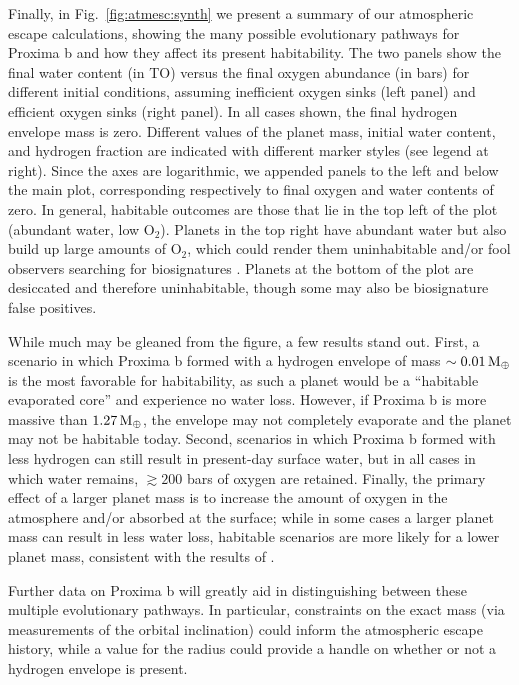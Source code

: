 \documentclass[preprint,12pt]{aastex}
\def\mearth{{\rm\,M_\oplus}}
\begin{document}
Finally, in Fig.~\ref{fig:atmesc:synth} we present a summary of our
atmospheric escape calculations, showing the many possible
evolutionary pathways for Proxima b and how they affect its present
habitability. The two panels show the final water content (in TO)
versus the final oxygen abundance (in bars) for different initial
conditions, assuming inefficient oxygen sinks (left panel) and
efficient oxygen sinks (right panel). In all cases shown, the final
hydrogen envelope mass is zero.  Different values of the planet mass,
initial water content, and hydrogen fraction are indicated with
different marker styles (see legend at right). Since the axes are
logarithmic, we appended panels to the left and below the main plot,
corresponding respectively to final oxygen and water contents of
zero. In general, habitable outcomes are those that lie in the top
left of the plot (abundant water, low O$_2$). Planets in the top right
have abundant water but also build up large amounts of O$_2$, which
could render them uninhabitable \citep{LugerBarnes15} and/or fool
observers searching for biosignatures \cite{Schwieterman16}. Planets at the bottom of the
plot are desiccated and therefore uninhabitable, though some may also
be biosignature false positives.

While much may be gleaned from the figure, a few results stand
out. First, a scenario in which Proxima b formed with a hydrogen
envelope of mass $\sim 0.01 \mearth$ is the most favorable for
habitability, as such a planet would be a ``habitable evaporated
core'' \citep{Luger15} and experience no water loss. However, if
Proxima b is more massive than $1.27 \mearth$, the envelope may not
completely evaporate and the planet may not be habitable
today. Second, scenarios in which Proxima b formed with less hydrogen
can still result in present-day surface water, but in all cases in
which water remains, $\gtrsim 200$ bars of oxygen are
retained. Finally, the primary effect of a larger planet mass is to
increase the amount of oxygen in the atmosphere and/or absorbed at the
surface; while in some cases a larger planet mass can result in less
water loss, habitable scenarios are more likely for a lower planet
mass, consistent with the results of \cite{LugerBarnes15}.

Further data on Proxima b will greatly aid in distinguishing between
these multiple evolutionary pathways. In particular, constraints on
the exact mass (via measurements of the orbital inclination) could
inform the atmospheric escape history, while a value for the radius
could provide a handle on whether or not a hydrogen envelope is
present.
\end{document}
